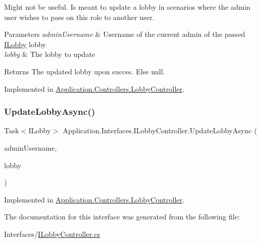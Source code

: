 Might not be useful. Is meant to update a lobby in scenarios where the admin user wishes to pass on this role to another user. 


\begin{DoxyParams}{Parameters}
{\em admin\+Username} & Username of the current admin of the passed \mbox{\hyperlink{}{I\+Lobby}} lobby\\
\hline
{\em lobby} & The lobby to update\\
\hline
\end{DoxyParams}
\begin{DoxyReturn}{Returns}
The updated lobby upon succes. Else null.
\end{DoxyReturn}


Implemented in \mbox{\hyperlink{class_application_1_1_controllers_1_1_lobby_controller_a415b61b5c78ba52619ac4d3606ecc32e}{Application.\+Controllers.\+Lobby\+Controller}}.

\mbox{\label{interface_application_1_1_interfaces_1_1_i_lobby_controller_a40457a8fb8d6801a8e42f1e75f9d3480}} 
\subsubsection{\texorpdfstring{Update\+Lobby\+Async()}{UpdateLobbyAsync()}}
{\footnotesize\ttfamily Task$<$I\+Lobby$>$ Application.\+Interfaces.\+I\+Lobby\+Controller.\+Update\+Lobby\+Async (\begin{DoxyParamCaption}\item[{string}]{admin\+Username,  }\item[{I\+Lobby}]{lobby }\end{DoxyParamCaption})}



Implemented in \mbox{\hyperlink{class_application_1_1_controllers_1_1_lobby_controller_a2f30842e0480f28ddbe51ab420b35049}{Application.\+Controllers.\+Lobby\+Controller}}.



The documentation for this interface was generated from the following file\+:\begin{DoxyCompactItemize}
\item 
Interfaces/\mbox{\hyperlink{_i_lobby_controller_8cs}{I\+Lobby\+Controller.\+cs}}\end{DoxyCompactItemize}
